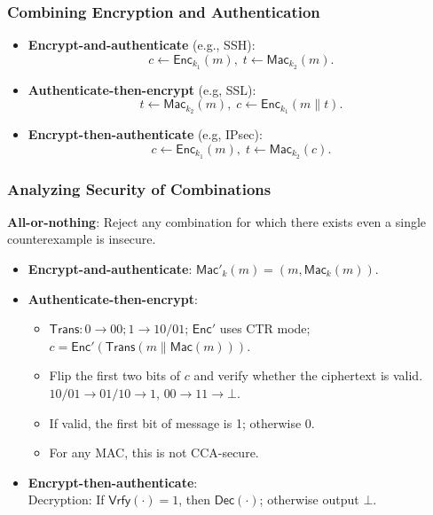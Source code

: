 \begin{frame}\frametitle{Combining Encryption and Authentication}
\begin{figure}
\begin{center}

\end{center}
\end{figure}
\begin{itemize}
\item \textbf{Encrypt-and-authenticate} (e.g., SSH):\[ c \gets \mathsf{Enc}_{k_1}(m),\; t \gets \mathsf{Mac}_{k_2}(m).\]
\item \textbf{Authenticate-then-encrypt} (e.g, SSL):\[ t \gets \mathsf{Mac}_{k_2}(m),\; c \gets \mathsf{Enc}_{k_1}(m\| t).\]
\item \textbf{Encrypt-then-authenticate} (e.g, IPsec):\[ c \gets \mathsf{Enc}_{k_1}(m),\; t \gets \mathsf{Mac}_{k_2}(c). \]
\end{itemize}
\end{frame}
\begin{frame}\frametitle{Analyzing Security of Combinations}
\textbf{All-or-nothing}: Reject any combination for which there exists even a single counterexample is insecure.
\begin{itemize}
\item \textbf{Encrypt-and-authenticate}: $\mathsf{Mac}'_k(m) = (m, \mathsf{Mac}_k(m))$.
\item \textbf{Authenticate-then-encrypt}: 
\begin{itemize}
\item $\mathsf{Trans}: 0 \to 00; 1 \to 10/01$; $\mathsf{Enc}'$ uses CTR mode; $c = \mathsf{Enc}'(\mathsf{Trans}(m\| \mathsf{Mac}(m)))$.
\item Flip the first two bits of $c$ and verify whether the ciphertext is valid.
$10/01 \to 01/10 \to 1$, $00 \to 11 \to \bot$.
\item If valid, the first bit of message is 1; otherwise 0.\\
\item For any MAC, this is not CCA-secure.
\end{itemize}
\item \textbf{Encrypt-then-authenticate}: \\
Decryption: If $\mathsf{Vrfy}(\cdot) = 1$, then $\mathsf{Dec}(\cdot)$; otherwise output $\bot$.
\end{itemize}
\end{frame}
